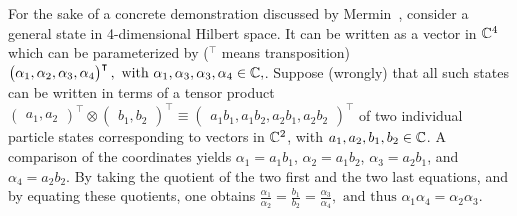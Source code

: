 \documentclass{ws-book9x6}
\begin{document}
For the sake of a concrete demonstration discussed by Mermin~\cite[Section~1.5]{mermin-07},
consider a general state in 4-dimensional Hilbert space.
It can be written as a vector in ${\Bbb C}^4$ which can be parameterized by
($^\intercal$ means transposition)
$
\begin{pmatrix}\alpha_1,\alpha_2,\alpha_3,\alpha_4\end{pmatrix}^\intercal , \textrm{ with } \alpha_1,\alpha_3,\alpha_3,\alpha_4 \in {\Bbb C},
$.
Suppose (wrongly)
that all such states can be written in terms of a tensor product
$%
\begin{pmatrix}a_1,a_2\end{pmatrix}^\intercal \otimes \begin{pmatrix}b_1,b_2\end{pmatrix}^\intercal
\equiv \begin{pmatrix}a_1b_1, a_1 b_2,a_2b_1,a_2b_2\end{pmatrix}^\intercal
$
of two individual particle states corresponding to vectors in  ${\Bbb C}^2$,
with $a_1,a_2,b_1,b_2\in {\Bbb C}$.
A comparison of the coordinates
yields
$\alpha_1=a_1b_1$,
$\alpha_2=a_1b_2$,
$\alpha_3=a_2b_1$, and
$\alpha_4=a_2b_2$.
By taking the quotient of the two first and the two last equations,
and by equating these quotients, one obtains
$%
\frac{\alpha_1}{\alpha_2}=\frac{b_1}{b_2}
=\frac{\alpha_3}{\alpha_4},\textrm{ and thus }
{\alpha_1}{\alpha_4}={\alpha_2}{\alpha_3}
$.
\end{document}
